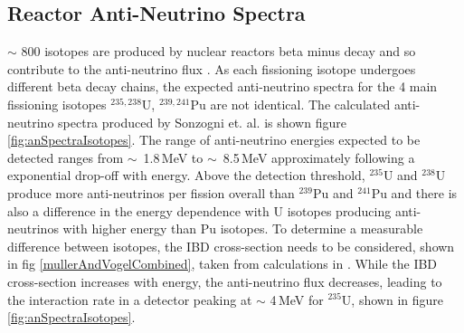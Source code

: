 \subsection{Reactor Anti-Neutrino Spectra}
$\sim$ 800 isotopes are produced by nuclear reactors beta minus decay and so contribute to the anti-neutrino flux \cite{sonzogni_nucStrcutre_2015}. As each fissioning isotope undergoes different beta decay chains, the expected anti-neutrino spectra for the 4 main fissioning isotopes $^{235,238}$U, $^{239,241}$Pu are not identical. The calculated anti-neutrino spectra produced by Sonzogni et. al. \cite{sonzogni_nucStrcutre_2015} is shown figure \ref{fig:anSpectraIsotopes}. The range of anti-neutrino energies expected to be detected ranges from $\sim$~1.8\,MeV to $\sim$~8.5\,MeV approximately following a exponential drop-off with energy. Above the detection threshold, $^{235}$U and $^{238}$U produce more anti-neutrinos per fission overall than $^{239}$Pu and $^{241}$Pu and there is also a difference in the energy dependence with U isotopes producing anti-neutrinos with higher energy than Pu isotopes. To determine a measurable difference between isotopes, the IBD cross-section needs to be considered, shown in fig \ref{mullerAndVogelCombined}, taken from calculations in \cite{Vogel_1999}. While the IBD cross-section increases with energy, the anti-neutrino flux decreases, leading to the interaction rate in a detector peaking at $\sim$ 4\,MeV for $^{235}$U, shown in figure \ref{fig:anSpectraIsotopes}.

